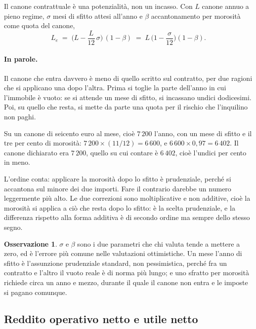 \documentclass[11pt,a4paper]{article}
\theoremstyle{definition}
\newtheorem{osservazione}[definizione]{Osservazione}
\theoremstyle{plain}
\begin{document}
Il canone contrattuale è una potenzialità, non un incasso. Con $L$ canone annuo a pieno regime, $\sigma$ mesi di sfitto attesi all'anno e $\beta$ accantonamento per morosità come quota del canone,
\begin{equation}
L_e \;=\; \Big(L - \frac{L}{12}\,\sigma\Big)\,(1-\beta)
\;=\; L\,\Big(1-\frac{\sigma}{12}\Big)(1-\beta).
\label{eq:ricavo-effettivo}
\end{equation}

\paragraph{In parole.} Il canone che entra davvero è meno di quello scritto sul contratto, per due ragioni che si applicano una dopo l'altra. Prima si toglie la parte dell'anno in cui l'immobile è vuoto: se si attende un mese di sfitto, si incassano undici dodicesimi. Poi, su quello che resta, si mette da parte una quota per il rischio che l'inquilino non paghi.

Su un canone di seicento euro al mese, cioè $7\,200$ l'anno, con un mese di sfitto e il tre per cento di morosità: $7\,200 \times (11/12) = 6\,600$, e $6\,600 \times 0{,}97 = 6\,402$. Il canone dichiarato era $7\,200$, quello su cui contare è $6\,402$, cioè l'undici per cento in meno.

L'ordine conta: applicare la morosità dopo lo sfitto è prudenziale, perché si accantona sul minore dei due importi. Fare il contrario darebbe un numero leggermente più alto.
Le due correzioni sono moltiplicative e non additive, cioè la morosità si applica a ciò che resta dopo lo sfitto: è la scelta prudenziale, e la differenza rispetto alla forma additiva è di secondo ordine ma sempre dello stesso segno.

\begin{osservazione}
$\sigma$ e $\beta$ sono i due parametri che chi valuta tende a mettere a zero, ed è l'errore più comune nelle valutazioni ottimistiche. Un mese l'anno di sfitto è l'assunzione prudenziale standard, non pessimistica, perché fra un contratto e l'altro il vuoto reale è di norma più lungo; e uno sfratto per morosità richiede circa un anno e mezzo, durante il quale il canone non entra e le imposte si pagano comunque.
\end{osservazione}

\subsection{Reddito operativo netto e utile netto}
\end{document}
